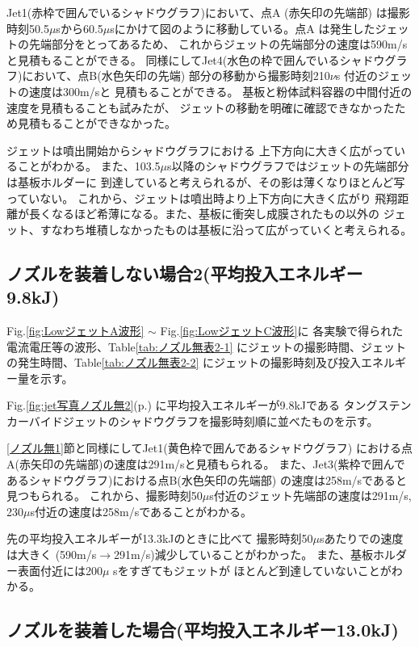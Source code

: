 Jet1(赤枠で囲んでいるシャドウグラフ)において、点A (赤矢印の先端部)
は撮影時刻50.5$\mu$sから60.5$\mu$sにかけて図のように移動している。点A
は発生したジェットの先端部分をとってあるため、
これからジェットの先端部分の速度は590m/sと見積もることができる。
同様にしてJet4(水色の枠で囲んでいるシャドウグラフ)において、点B(水色矢印の先端)
部分の移動から撮影時刻210$\nu$s 付近のジェットの速度は300m/sと
見積もることができる。
基板と粉体試料容器の中間付近の速度を見積もることも試みたが、
ジェットの移動を明確に確認できなかったため見積もることができなかった。

ジェットは噴出開始からシャドウグラフにおける
上下方向に大きく広がっていることがわかる。
また、103.5$\mu $s以降のシャドウグラフではジェットの先端部分は基板ホルダーに
到達していると考えられるが、その影は薄くなりほとんど写っていない。
これから、ジェットは噴出時より上下方向に大きく広がり
飛翔距離が長くなるほど希薄になる。また、基板に衝突し成膜されたもの以外の
ジェット、すなわち堆積しなかったものは基板に沿って広がっていくと考えられる。


\subsection{ノズルを装着しない場合2(平均投入エネルギー9.8kJ)}

Fig.\ref{fig:LowジェットA波形} $\sim$ Fig.\ref{fig:LowジェットC波形}に
各実験で得られた電流電圧等の波形、Table\ref{tab:ノズル無表2-1}
にジェットの撮影時間、ジェットの発生時間、Table\ref{tab:ノズル無表2-2}
にジェットの撮影時刻及び投入エネルギー量を示す。

Fig.\ref{fig:jet写真ノズル無2}(p.\pageref{fig:jet写真ノズル無2})
に平均投入エネルギーが9.8kJである
タングステンカーバイドジェットのシャドウグラフを撮影時刻順に並べたものを示す。

\ref{ノズル無1}節と同様にしてJet1(黄色枠で囲んであるシャドウグラフ)
における点A(赤矢印の先端部)の速度は291m/sと見積もられる。
また、Jet3(紫枠で囲んであるシャドウグラフ)における点B(水色矢印の先端部)
の速度は258m/sであると見つもられる。
これから、撮影時刻50$\mu$s付近のジェット先端部の速度は291m/s,
230$\mu$s付近の速度は258m/sであることがわかる。

先の平均投入エネルギーが13.3kJのときに比べて
撮影時刻50$\mu$sあたりでの速度は大きく
(590m/s$\to$291m/s)減少していることがわかった。
また、基板ホルダー表面付近には200$\mu$ sをすぎてもジェットが
ほとんど到達していないことがわかる。


\subsection{ノズルを装着した場合(平均投入エネルギー13.0kJ)}

